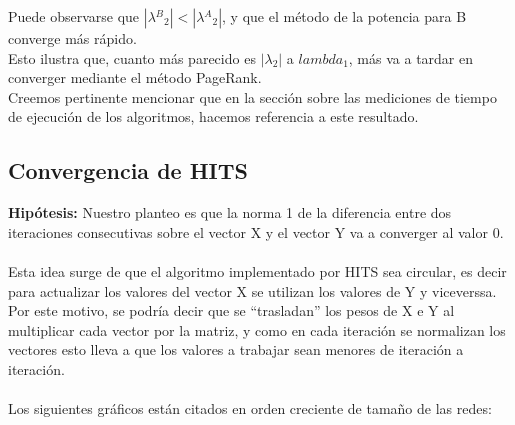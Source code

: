 \documentclass[a4paper]{article}
\begin{document}
Puede observarse que $|\lambda{^B}{_2}| < |\lambda{^A}{_2}|$, y que el método de la potencia para B converge más rápido.\\
Esto ilustra que, cuanto más parecido es $|\lambda_2|$ a $lambda_1$, más va a tardar en converger mediante el método PageRank.\\


Creemos pertinente mencionar que en la sección sobre las mediciones de tiempo de ejecución de los algoritmos, hacemos referencia a este resultado.




\newpage
\subsection{Convergencia de HITS}

\textbf{Hip\'otesis:} Nuestro planteo es que la norma 1 de la diferencia entre dos iteraciones consecutivas sobre el vector X y el vector Y va a converger al valor 0.\\
\\
\indent Esta idea surge de que el algoritmo implementado por HITS sea circular, es decir para actualizar los valores del vector X se utilizan los valores de Y y viceverssa. Por este motivo, se podr\'ia decir que se ``trasladan'' los pesos de X e Y al multiplicar cada vector por la matriz, y como en cada iteraci\'on se normalizan los vectores esto lleva a que los valores a trabajar sean menores de iteraci\'on a iteraci\'on. \\
\\


Los siguientes gr\'aficos est\'an citados en orden creciente de tama\~no de las redes:\\
\end{document}
